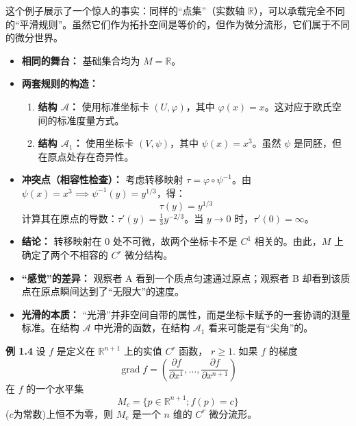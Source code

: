 \begin{myremark}[同一空间的异构世界]
这个例子展示了一个惊人的事实：同样的“点集”（实数轴 $\mathbb{R}$），可以承载完全不同的“平滑规则”。虽然它们作为拓扑空间是等价的，但作为微分流形，它们属于不同的微分世界。

\begin{itemize}
    \item \textbf{相同的舞台：} 基础集合均为 $M = \mathbb{R}$。
    \item \textbf{两套规则的构造：}
    \begin{enumerate}
        \item \textbf{结构 $\mathcal{A}$：} 使用标准坐标卡 $(U, \varphi)$，其中 $\varphi(x) = x$。这对应于欧氏空间的标准度量方式。
        \item \textbf{结构 $\mathcal{A}_1$：} 使用坐标卡 $(V, \psi)$，其中 $\psi(x) = x^3$。虽然 $\psi$ 是同胚，但在原点处存在奇异性。
    \end{enumerate}
    \item \textbf{冲突点（相容性检查）：} 
    考虑转移映射 $\tau = \varphi \circ \psi^{-1}$。由 $\psi(x) = x^3 \implies \psi^{-1}(y) = y^{1/3}$，得：
    \begin{equation}
    \tau(y) = y^{1/3} \tag{转移映射}
    \end{equation}
    计算其在原点的导数：$\tau'(y) = \frac{1}{3}y^{-2/3}$。当 $y \to 0$ 时，$\tau'(0) = \infty$。
    \item \textbf{结论：} 转移映射在 $0$ 处不可微，故两个坐标卡不是 $C^1$ 相关的。由此，$M$ 上确定了两个不相容的 $C^r$ 微分结构。

    \item \textbf{“感觉”的差异：} 观察者 A 看到一个质点匀速通过原点；观察者 B 却看到该质点在原点瞬间达到了“无限大”的速度。
    \item \textbf{光滑的本质：} “光滑”并非空间自带的属性，而是坐标卡赋予的一套协调的测量标准。在结构 $\mathcal{A}$ 中光滑的函数，在结构 $\mathcal{A}_1$ 看来可能是有“尖角”的。
\end{itemize}
\end{myremark}

{\bf 例 1.4} 设  $f$  是定义在  $\mathbb{R}^{n+1}$  上的实值  $C^r$  函数， $r \geqslant 1$. 如果  $f$  的梯度
$$
\operatorname {g r a d} f = \left(\frac {\partial f}{\partial x ^ {1}}, \dots , \frac {\partial f}{\partial x ^ {n + 1}}\right)
$$
在  $f$  的一个水平集
$$
M _ {c} = \{p \in \mathbb {R} ^ {n + 1}; f (p) = c \}
$$
($c$为常数)上恒不为零，则  $M_{c}$  是一个  ${n}$  维的  $C^r$  微分流形。


